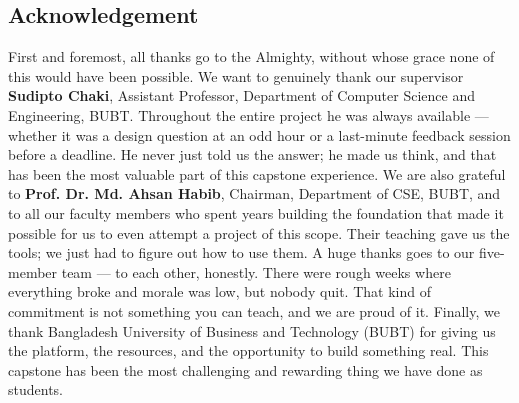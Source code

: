 \begin{center}
    \section*{Acknowledgement}
\end{center}
\large First and foremost, all thanks go to the Almighty, without whose grace none of this
would have been possible. We want to genuinely thank our supervisor \textbf{Sudipto Chaki}, Assistant Professor,
Department of Computer Science and Engineering, BUBT. Throughout the entire project he was
always available --- whether it was a design question at an odd hour or a last-minute
feedback session before a deadline. He never just told us the answer; he made us think, and
that has been the most valuable part of this capstone experience. We are also grateful to \textbf{Prof. Dr. Md. Ahsan Habib}, Chairman, Department of CSE,
BUBT, and to all our faculty members who spent years building the foundation that made it
possible for us to even attempt a project of this scope. Their teaching gave us the tools;
we just had to figure out how to use them. A huge thanks goes to our five-member team --- to each other, honestly. There were rough
weeks where everything broke and morale was low, but nobody quit. That kind of
commitment is not something you can teach, and we are proud of it. Finally, we thank Bangladesh University of Business and Technology (BUBT) for giving us
the platform, the resources, and the opportunity to build something real. This capstone
has been the most challenging and rewarding thing we have done as students.